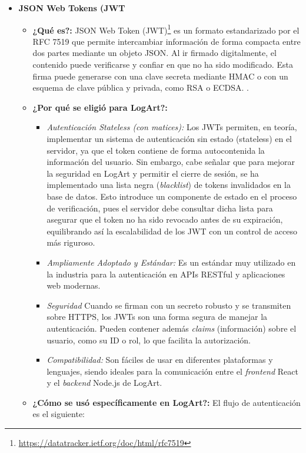 \begin{itemize}
    \item \textbf{JSON Web Tokens (JWT}
        \begin{itemize}
            \item \textbf{¿Qué es?:} JSON Web Token (JWT)\footnote{\url{https://datatracker.ietf.org/doc/html/rfc7519}} es un formato estandarizado por el RFC 7519 que permite intercambiar información de forma compacta entre dos partes mediante un objeto JSON. Al ir firmado digitalmente, el contenido puede verificarse y confiar en que no ha sido modificado. Esta firma puede generarse con una clave secreta mediante HMAC o con un esquema de clave pública y privada, como RSA o ECDSA. \cite{caronteJWT}.
            \item \textbf{¿Por qué se eligió para LogArt?:}
                \begin{itemize}
                    \item \textit{Autenticación Stateless (con matices):} Los JWTs permiten, en teoría, implementar un sistema de autenticación sin estado (stateless) en el servidor, ya que el token contiene de forma autocontenida la información del usuario. Sin embargo, cabe señalar que para mejorar la seguridad en LogArt y permitir el cierre de sesión, se ha implementado una lista negra (\textit{blacklist}) de tokens invalidados en la base de datos. Esto introduce un componente de estado en el proceso de verificación, pues el servidor debe consultar dicha lista para asegurar que el token no ha sido revocado antes de su expiración, equilibrando así la escalabilidad de los JWT con un control de acceso más riguroso.
                    \item \textit{Ampliamente Adoptado y Estándar:} Es un estándar muy utilizado en la industria para la autenticación en APIs RESTful y aplicaciones web modernas.
                    \item \textit{Seguridad} Cuando se firman con un secreto robusto y se transmiten sobre HTTPS, los JWTs son una forma segura de manejar la autenticación. Pueden contener además \textit{claims} (información) sobre el usuario, como su ID o rol, lo que facilita la autorización.
                    \item \textit{Compatibilidad:} Son fáciles de usar en diferentes plataformas y lenguajes, siendo ideales para la comunicación entre el \textit{frontend} React y el \textit{backend} Node.js de LogArt.
                \end{itemize}
            \item \textbf{¿Cómo se usó específicamente en LogArt?:} El flujo de autenticación es el siguiente:

\end{itemize}
\end{itemize}
